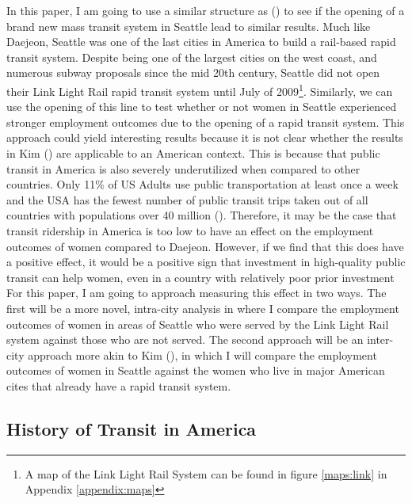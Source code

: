 \documentclass[A4paper,12pt]{article}
\begin{document}
In this paper, I am going to use a similar structure as \citeauthor{kim_subways_2019} (\citeyear{kim_subways_2019}) to see if the opening of a brand new mass transit system in Seattle lead to similar results. Much like Daejeon, Seattle was one of the last cities in America to build a rail-based rapid transit system. Despite being one of the largest cities on the west coast, and numerous subway proposals since the mid 20th century, Seattle did not open their Link Light Rail rapid transit system until July of 2009\footnote{A map of the Link Light Rail System can be found in figure \ref{maps:link} in Appendix \ref{appendix:maps}}. Similarly, we can use the opening of this line to test whether or not women in Seattle experienced stronger employment outcomes due to the opening of a rapid transit system. This approach could yield interesting results because it is not clear whether the results in Kim (\citeyear{kim_subways_2019}) are applicable to an American context. This is because that public transit in America is also severely underutilized when compared to other countries. Only 11\% of US Adults use public transportation at least once a week and the USA has the fewest number of public transit trips taken out of all countries with populations over 40 million (\cite{pedram_saeidizand_urban_2017}). Therefore, it may be the case that transit ridership in America is too low to have an effect on the employment outcomes of women compared to Daejeon. However, if we find that this does have a positive effect, it would be a positive sign that investment in high-quality public transit can help women, even in a country with relatively poor prior investment \\

For this paper, I am going to approach measuring this effect in two ways. The first will be a more novel, intra-city analysis in where I compare the employment outcomes of women in areas of Seattle who were served by the Link Light Rail system against those who are not served. The second approach will be an inter-city approach more akin to Kim (\citeyear{kim_subways_2019}), in which I will compare the employment outcomes of women in Seattle against the women who live in major American cites that already have a rapid transit system. \\


\subsection{History of Transit in America}
\end{document}
